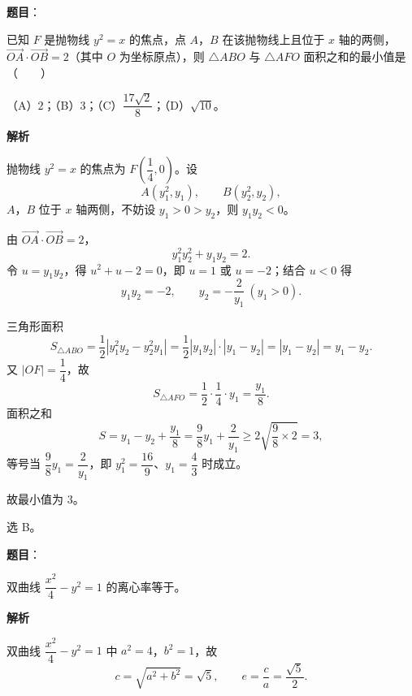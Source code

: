 \begin{answer}

\textbf{题目}：

已知 $F$ 是抛物线 $y^2=x$ 的焦点，点 $A$，$B$ 在该抛物线上且位于 $x$ 轴的两侧，$\overrightarrow{OA}\cdot\overrightarrow{OB}=2$（其中 $O$ 为坐标原点），则 $\triangle ABO$ 与 $\triangle AFO$ 面积之和的最小值是\mbox{（　　）}

（A）$2$；（B）$3$；（C）$\dfrac{17\sqrt2}8$；（D）$\sqrt{10}$。

\textbf{解析}

抛物线 $y^2=x$ 的焦点为 $F\left(\dfrac14,0\right)$。设
\nopagebreak[4]
\[A(y_1^2,y_1),\qquad B(y_2^2,y_2),\]
$A$，$B$ 位于 $x$ 轴两侧，不妨设 $y_1>0>y_2$，则 $y_1y_2<0$。

由 $\overrightarrow{OA}\cdot\overrightarrow{OB}=2$，
\nopagebreak[4]
\[y_1^2y_2^2+y_1y_2=2 .\]
令 $u=y_1y_2$，得 $u^2+u-2=0$，即 $u=1$ 或 $u=-2$；结合 $u<0$ 得
\nopagebreak[4]
\[y_1y_2=-2,\qquad y_2=-\frac2{y_1}\ (y_1>0).\]

三角形面积
\nopagebreak[4]
\[S_{\triangle ABO}=\frac12\left|y_1^2y_2-y_2^2y_1\right|
=\frac12|y_1y_2|\cdot|y_1-y_2|=|y_1-y_2|=y_1-y_2 .\]
又 $|OF|=\dfrac14$，故
\nopagebreak[4]
\[S_{\triangle AFO}=\frac12\cdot\frac14\cdot y_1=\frac{y_1}8 .\]
面积之和
\nopagebreak[4]
\[S=y_1-y_2+\frac{y_1}8=\frac98y_1+\frac2{y_1}\geqslant 2\sqrt{\frac98\times2}=3,\]
等号当 $\dfrac98y_1=\dfrac2{y_1}$，即 $y_1^2=\dfrac{16}9$、$y_1=\dfrac43$ 时成立。

故最小值为 $3$。

选 B。


\end{answer}
\begin{answer}

\textbf{题目}：

双曲线 $\dfrac{x^2}4-y^2=1$ 的离心率等于\gkblank{}。

\textbf{解析}

双曲线 $\dfrac{x^2}4-y^2=1$ 中 $a^2=4$，$b^2=1$，故
\nopagebreak[4]
\[c=\sqrt{a^2+b^2}=\sqrt5,\qquad e=\frac ca=\frac{\sqrt5}2 .\]


\end{answer}
